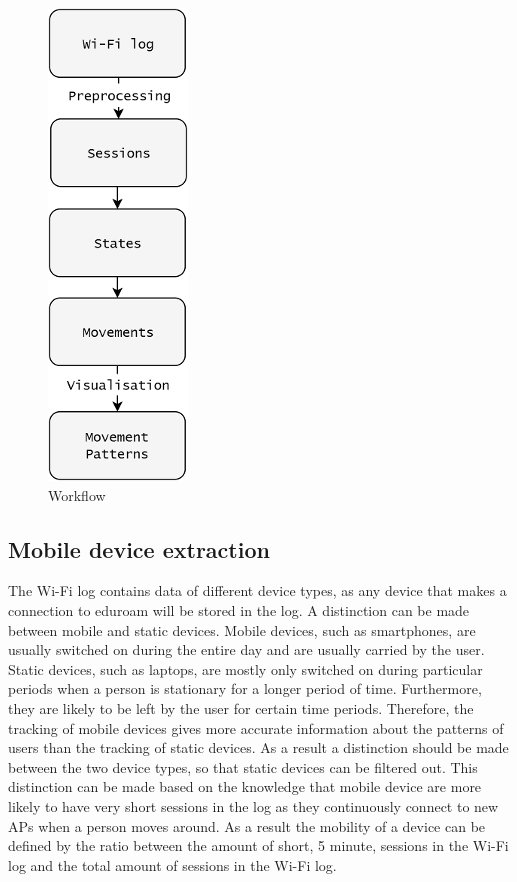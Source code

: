 \begin{figure}[H]
\centering
\includegraphics[scale=0.15]{ES-workflow}
\captionsetup{justification=centering}
\caption{Workflow}
\label{figure:ES-workflow}
\end{figure}

\subsection{Mobile device extraction}\label{ES-mobileDeviceExtraction}
The Wi-Fi log contains data of different device types, as any device that makes a connection to eduroam will be stored in the log. A distinction can be made between mobile and static devices. Mobile devices, such as smartphones, are usually switched on during the entire day and are usually carried by the user. Static devices, such as laptops, are mostly only switched on during particular periods when a person is stationary for a longer period of time. Furthermore, they are likely to be left by the user for certain time periods. Therefore, the tracking of mobile devices gives more accurate information about the patterns of users than the tracking of static devices. As a result a distinction should be made between the two device types, so that static devices can be filtered out. This distinction can be made based on the knowledge that mobile device are more likely to have very short sessions in the log as they continuously connect to new APs when a person moves around. As a result the mobility of a device can be defined by the ratio between the amount of short, 5 minute, sessions in the Wi-Fi log and the total amount of sessions in the Wi-Fi log.

